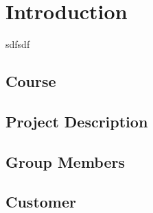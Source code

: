 
\chapter{Introduction}

sdfsdf \cite{wikipedia1}

\section{Course}

\section{Project Description}

\section{Group Members}

\section{Customer}

\cleardoublepage